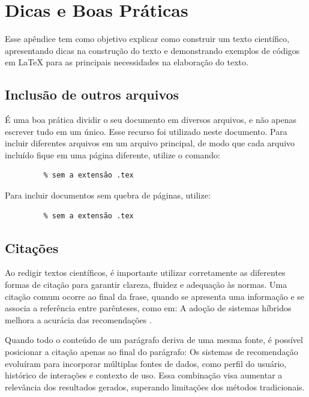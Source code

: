 \chapter{Dicas e Boas Práticas} \label{chp:ap_dicas}

Esse apêndice tem como objetivo explicar como construir um texto científico, apresentando dicas na construção do texto e demonstrando exemplos de códigos em LaTeX para as principais necessidades na elaboração do texto.

\section{Inclusão de outros arquivos}

É uma boa prática dividir o seu documento em diversos arquivos, 
e não
apenas escrever tudo em um único. 
Esse recurso foi utilizado neste documento. 
Para incluir diferentes arquivos em um arquivo principal, 
de modo que cada arquivo incluído fique em uma página diferente, utilize o comando:

\begin{verbatim}
         % sem a extensão .tex
\end{verbatim}

Para incluir documentos sem quebra de páginas, utilize:

\begin{verbatim}
         % sem a extensão .tex
\end{verbatim}

\section{Citações}

Ao redigir textos científicos, é importante utilizar corretamente as diferentes formas de citação para garantir clareza, fluidez e adequação às normas. Uma citação comum ocorre ao final da frase, quando se apresenta uma informação e se associa a referência entre parênteses, como em: A adoção de sistemas híbridos melhora a acurácia das recomendações \cite{braida2015transforming}.

Quando todo o conteúdo de um parágrafo deriva de uma mesma fonte, é possível posicionar a citação apenas ao final do parágrafo: Os sistemas de recomendação evoluíram para incorporar múltiplas fontes de dados, como perfil do usuário, histórico de interações e contexto de uso. Essa combinação visa aumentar a relevância dos resultados gerados, superando limitações dos métodos tradicionais. \cite{braida2015transforming}

